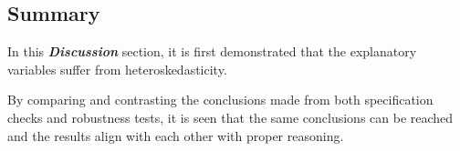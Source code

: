 \subsection{Summary}
In this \textbf{\textit{Discussion}} section, it is first demonstrated that the explanatory variables suffer from heteroskedasticity.

By comparing and contrasting the conclusions made from both specification checks and robustness tests, it is seen that the same conclusions can be reached and the results align with each other with proper reasoning.

\newpage